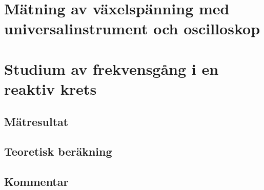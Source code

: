 \documentclass[11pt,a4paper]{article}
\begin{document}
\section{Mätning av växelspänning med universalinstrument och oscilloskop}\label{}


\section{Studium av frekvensgång i en reaktiv krets}\label{}

\subsection{Mätresultat}\label{}

\subsection{Teoretisk beräkning}\label{}

\subsection{Kommentar}\label{}


\end{document}
